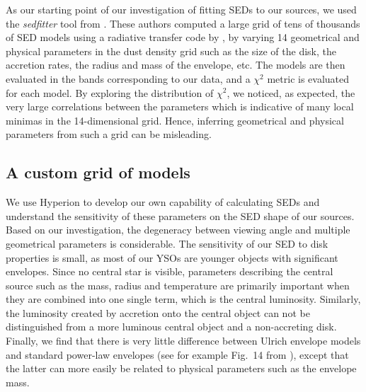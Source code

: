 As our starting point of our investigation of fitting SEDs to our sources, we used the \textit{sedfitter} tool from \citep{Robitaille:2006cb}. These authors computed a large grid of tens of thousands of SED models using a radiative transfer code by \citep{Whitney:2003ke}, by varying 14 geometrical and physical parameters in the dust density grid such as the size of the disk, the accretion rates, the radius and mass of the envelope, etc. The models are then evaluated in the bands corresponding to our data, and a $\chi^2$ metric is evaluated for each model. By exploring the distribution of $\chi^2$, we noticed, as expected, the very large correlations between the parameters which is indicative of many local minimas in the 14-dimensional grid. Hence, inferring geometrical and physical parameters from such a grid can be misleading.

\subsection{A custom grid of models}

We use Hyperion \citep[][see also in Section~\ref{subsubsec:radiative}]{Robitaille:2011fc} to develop our own capability of calculating SEDs and understand the sensitivity of these parameters on the SED shape of our sources. Based on our investigation, the degeneracy between viewing angle and multiple geometrical parameters is considerable. The sensitivity of our SED to disk properties is small, as most of our YSOs are younger objects with significant envelopes. Since no central star is visible, parameters describing the central source such as the mass, radius and temperature are primarily important when they are combined into one single term, which is the central luminosity. Similarly, the luminosity created by accretion onto the central object can not be distinguished from a more luminous central object and a non-accreting disk. Finally, we find that there is very little difference between Ulrich envelope models \citep{Ulrich:1976ho} and standard power-law envelopes (see for example Fig.~14 from \citet{Whitney:2013cw}), except that the latter can more easily be related to physical parameters such as the envelope mass. 

